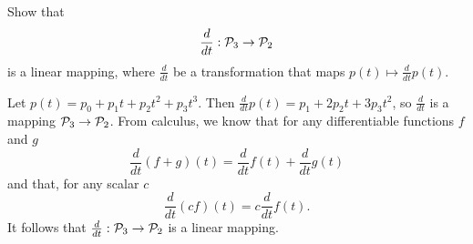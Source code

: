 \documentclass{ximera}
\begin{document}
\begin{exercise}  \label{c7.2.2a}
Show that
\[
\frac{d}{dt}:{\cal P}_3\to{\cal P}_2
\]
is a linear mapping, where $\frac{d}{dt}$ be a transformation that maps $p(t) \mapsto
\frac{d}{dt}p(t)$.  

\begin{solution}

\soln
Let $p(t) =  p_0 + p_1t + p_2t^2 + p_3t^3$.  Then
$\frac{d}{dt}p(t) = p_1 + 2p_2t + 3p_3t^2$, so $\frac{d}{dt}$ is 
a mapping ${\cal P}_3 \rightarrow {\cal P}_2$.  From calculus, we
know that for any differentiable functions $f$ and $g$
\[ 
\frac{d}{dt}(f + g)(t) = \frac{d}{dt}f(t) + \frac{d}{dt}g(t) 
\]
and that, for any scalar $c$
\[ 
\frac{d}{dt}(cf)(t) = c\frac{d}{dt}f(t). 
\]
It follows that  $\frac{d}{dt}: {\cal P}_3 \rightarrow {\cal P}_2$ is a linear mapping.

\end{solution}
\end{exercise}
\end{document}
